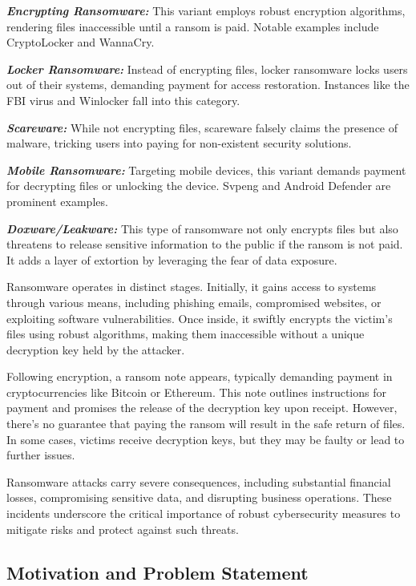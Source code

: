 \documentclass[12pt,letterpaper]{article}
\begin{document}
    \textbf{\textit{Encrypting Ransomware:}} This variant employs robust encryption algorithms, rendering files inaccessible until a ransom is paid. Notable examples include CryptoLocker and WannaCry.

    \textbf{\textit{Locker Ransomware:}} Instead of encrypting files, locker ransomware locks users out of their systems, demanding payment for access restoration. Instances like the FBI virus and Winlocker fall into this category.

    \textbf{\textit{Scareware:}} While not encrypting files, scareware falsely claims the presence of malware, tricking users into paying for non-existent security solutions.

    \textbf{\textit{Mobile Ransomware:}} Targeting mobile devices, this variant demands payment for decrypting files or unlocking the device. Svpeng and Android Defender are prominent examples.
    
    \textbf{\textit{Doxware/Leakware:}} This type of ransomware not only encrypts files but also threatens to release sensitive information to the public if the ransom is not paid. It adds a layer of extortion by leveraging the fear of data exposure.
    \vspace{5mm}
    
    Ransomware operates in distinct stages. Initially, it gains access to systems through various means, including phishing emails, compromised websites, or exploiting software vulnerabilities. Once inside, it swiftly encrypts the victim's files using robust algorithms, making them inaccessible without a unique decryption key held by the attacker.

    Following encryption, a ransom note appears, typically demanding payment in cryptocurrencies like Bitcoin or Ethereum. This note outlines instructions for payment and promises the release of the decryption key upon receipt. However, there's no guarantee that paying the ransom will result in the safe return of files. In some cases, victims receive decryption keys, but they may be faulty or lead to further issues.

    Ransomware attacks carry severe consequences, including substantial financial losses, compromising sensitive data, and disrupting business operations. These incidents underscore the critical importance of robust cybersecurity measures to mitigate risks and protect against such threats.

    \subsection{Motivation and Problem Statement}
\end{document}
